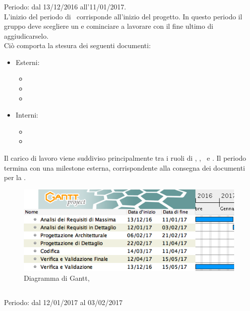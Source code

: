 \subsubsection{\ARM}
Periodo: dal 13/12/2016 all'11/01/2017. \\

L'inizio del periodo di \ARM\ corrisponde all'inizio del progetto. In questo periodo il gruppo deve scegliere un  e cominciare a lavorare con il fine ultimo di aggiudicarselo.\\
Ciò comporta la stesura dei seguenti documenti:
 \begin{itemize}
 \item Esterni:
 	\begin{itemize}
 	 \item \AdR
 	 \item \PdP
	 \item \PdQ
 	\end{itemize}
 \item  Interni:
	\begin{itemize}
	\item \SdF
	\item \NdP
	\end{itemize} 
 \end{itemize}
 Il carico di lavoro viene suddiviso principalmente tra i ruoli di \An, \Am, \Ver\ e \Pm.
 Il periodo termina con una milestone esterna, corrispondente alla consegna dei documenti per la \RR.
 
 \begin{figure}[H]
	\centering 
	\includegraphics[scale=0.5]{Immagini/Gantt/ARM.png}
	\caption{Diagramma di Gantt, \ARM}
\end{figure}

\subsection{\ARD}
Periodo: dal 12/01/2017 al 03/02/2017 \\

